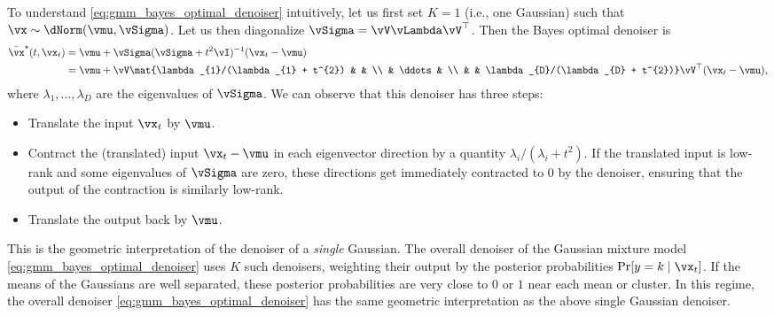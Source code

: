 \documentclass[../../book-main.tex]{subfiles}
\begin{document}
\begin{example}
    To understand \eqref{eq:gmm_bayes_optimal_denoiser}
    intuitively, let us first set \(K = 1\) (i.e., one Gaussian) such
    that \(\vx \sim \dNorm(\vmu, \vSigma)\). Let us then diagonalize
    \(\vSigma = \vV\vLambda \vV^{\top}\). Then the Bayes optimal denoiser is
    \begin{align}
        \bar{\vx}^{\star}(t, \vx_{t}) & = \vmu + \vSigma(\vSigma +
        t^{2}\vI)^{-1}(\vx_{t} - \vmu) \\
        & = \vmu + \vV\mat{\lambda_{1}/(\lambda_{1} + t^{2}) & & \\ &
            \ddots & \\ & & \lambda_{D}/(\lambda_{D} +
        t^{2})}\vV^{\top}(\vx_{t} - \vmu),\label{eq:gaussian_denoiser}
    \end{align}
    where \(\lambda_{1}, \dots, \lambda_{D}\) are the eigenvalues of
    \(\vSigma\). We can observe that this denoiser has three steps:
    \begin{itemize}
        \item Translate the input \(\vx_{t}\) by \(\vmu\).
        \item Contract the (translated) input \(\vx_{t} - \vmu\) in
            each eigenvector direction by a quantity
            \(\lambda_{i}/(\lambda_{i} + t^{2})\). If the translated
            input is low-rank and some eigenvalues of \(\vSigma\) are
            zero, these directions get immediately contracted to
            \(0\) by the denoiser, ensuring that the output of the
            contraction is similarly low-rank.
        \item Translate the output back by \(\vmu\).
    \end{itemize}
    This is the geometric interpretation of the denoiser of a
    \textit{single} Gaussian. The overall denoiser of the Gaussian
    mixture model \eqref{eq:gmm_bayes_optimal_denoiser} uses \(K\)
    such denoisers, weighting their output by the posterior
    probabilities \(\Pr[y = k \mid \vx_{t}]\). If the means of the
    Gaussians are well separated, these posterior probabilities are
    very close to \(0\) or \(1\) near each mean or cluster. In this
    regime, the overall denoiser
    \eqref{eq:gmm_bayes_optimal_denoiser} has the same geometric
    interpretation as the above single Gaussian denoiser.
\end{example}
\end{document}
